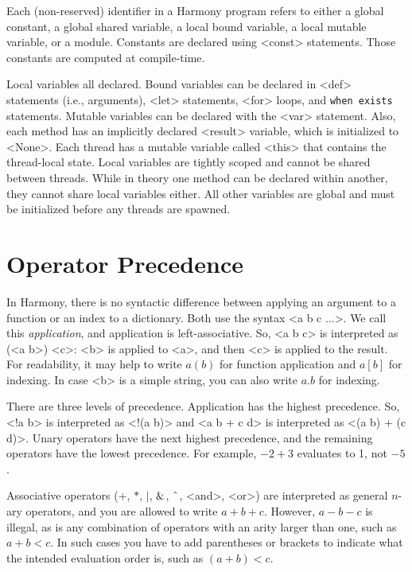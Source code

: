 \documentclass{report}
\begin{document}
Each (non-reserved) identifier in a Harmony program refers to either
a global constant, a global shared variable, a local bound variable,
a local mutable variable, or a module.
Constants are declared using <{const}> statements.
Those constants are computed at compile-time.

Local variables all declared.
Bound variables can be declared in
<{def}> statements (i.e., arguments),
<{let}> statements, <{for}> loops, and \texttt{when exists} statements.
Mutable variables can be declared with the <{var}> statement.
Also, each method has an implicitly declared
<{result}> variable, which is initialized to <{None}>.
Each thread has a mutable variable called <{this}> that contains
the thread-local state.
Local variables are tightly scoped and cannot be shared
between threads.
While in theory one method can be declared within another,
they cannot share local variables either.
All other variables are global and must be initialized
before any threads are spawned.

\section{Operator Precedence}

In Harmony, there is no syntactic difference between applying an argument to a function
or an index to a dictionary.  Both use the syntax <{a b c ...}>.
We call this \emph{application}, and application is left-associative.
So, <{a b c}> is interpreted as (<{a b}>) <{c}>: <{b}> is applied to <{a}>,
and then <{c}> is applied to the result.
For readability, it may help to write $a(b)$ for function application and
$a[b]$ for indexing.  In case <{b}> is a simple string,
you can also write $a.b$ for indexing.

There are three levels of precedence.
Application has the highest precedence.  So, <{!a b}> is interpreted as
<{!(a b)}> and <{a b + c d}> is interpreted as <{(a b) + (c d)}>.
Unary operators have the next highest precedence,
and the remaining operators have the lowest precedence.
For example, $-2 + 3$ evaluates to 1, not $-5$.

Associative operators ($+$, $*$, $|$, $\string&$, $\string^$, <{and}>, <{or}>)
are interpreted as general $n$-ary operators, and you are allowed to write
$a + b + c$.  However, $a - b - c$ is illegal, as is any combination of operators with an
arity larger than one, such as $a + b < c$.
In such cases you have to add parentheses or brackets to indicate what
the intended evaluation order is, such as $(a + b) < c$.
\end{document}
